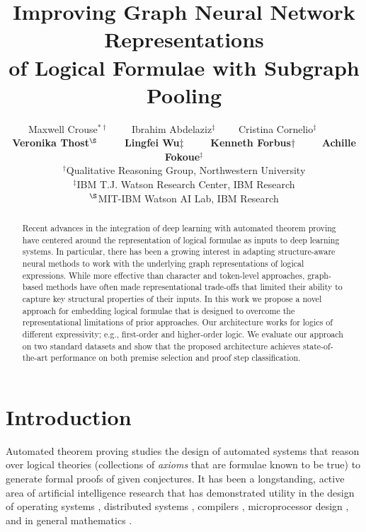 \documentclass{article}
\title{Improving Graph Neural Network Representations \\ of Logical Formulae with Subgraph Pooling}
\author{Maxwell Crouse$^{*\dagger}$ \ \ \ \ Ibrahim Abdelaziz$^\ddag$ \ \ \ \ Cristina Cornelio$^\ddag$ \ \ \ \ \\ {\bf Veronika Thost$^\S$ \ \ \ \ Lingfei Wu$\ddag$ \ \ \ \ Kenneth Forbus$\dagger$ \ \ \ \ Achille Fokoue$^\ddag$} \\
  $^\dagger$Qualitative Reasoning Group, Northwestern University \\
  $^\ddag$IBM T.J. Watson Research Center, IBM Research \\
  $^\S$MIT-IBM Watson AI Lab, IBM Research
}
\begin{document}
\maketitle

\begin{abstract}
Recent advances in the integration of deep learning with automated theorem proving have centered around the representation of logical formulae as inputs to deep learning systems. In particular, there has been a growing interest in adapting structure-aware neural methods to work with the underlying graph representations of logical expressions. While more effective than character and token-level approaches, graph-based methods have often made representational trade-offs that limited their ability to capture key structural properties of their inputs. In this work we propose a novel approach for embedding logical formulae that is designed to overcome the representational limitations of prior approaches. Our architecture works for logics of different expressivity; e.g., first-order and higher-order logic. 
We evaluate our approach on two standard datasets and show that the proposed architecture achieves state-of-the-art performance on both premise selection and proof step classification.


\end{abstract}



\section{Introduction}
\label{sec:intro}

Automated theorem proving studies the design of automated systems that reason over 
logical theories (collections of \emph{axioms} that are formulae known to be true) to generate formal proofs of given conjectures. It has been a longstanding, active area of artificial intelligence research that has demonstrated utility in the design of operating systems \cite{klein2009operating,klein2014comprehensive}, distributed systems \cite{garland1998ioa,hawblitzel2015ironfleet}, compilers \cite{curzon1991verified,leroy2009formal}, microprocessor design \cite{hunt1989microprocessor}, and in general mathematics \cite{hales2017formal}.
\end{document}

